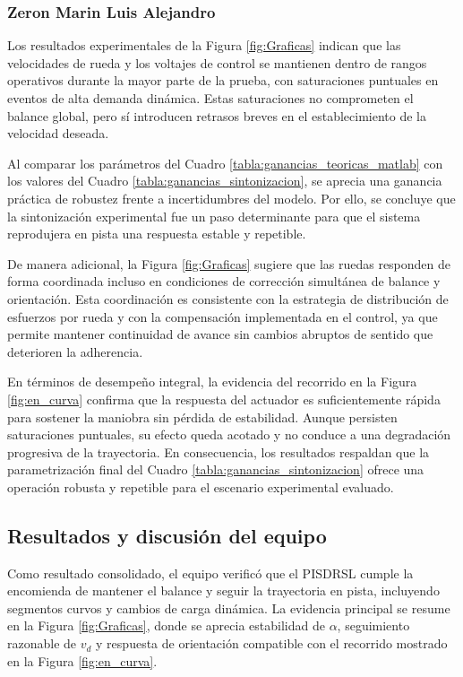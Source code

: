 \documentclass{article}
\begin{document}
\subsubsection{Zeron Marin Luis Alejandro}
Los resultados experimentales de la Figura \ref{fig:Graficas} indican que las velocidades de rueda y los voltajes de control se mantienen dentro de rangos operativos durante la mayor parte de la prueba, con saturaciones puntuales en eventos de alta demanda dinámica. Estas saturaciones no comprometen el balance global, pero sí introducen retrasos breves en el establecimiento de la velocidad deseada.

Al comparar los parámetros del Cuadro \ref{tabla:ganancias_teoricas_matlab} con los valores del Cuadro \ref{tabla:ganancias_sintonizacion}, se aprecia una ganancia práctica de robustez frente a incertidumbres del modelo. Por ello, se concluye que la sintonización experimental fue un paso determinante para que el sistema reprodujera en pista una respuesta estable y repetible.

De manera adicional, la Figura \ref{fig:Graficas} sugiere que las ruedas responden de forma coordinada incluso en condiciones de corrección simultánea de balance y orientación. Esta coordinación es consistente con la estrategia de distribución de esfuerzos por rueda y con la compensación implementada en el control, ya que permite mantener continuidad de avance sin cambios abruptos de sentido que deterioren la adherencia.

En términos de desempeño integral, la evidencia del recorrido en la Figura \ref{fig:en_curva} confirma que la respuesta del actuador es suficientemente rápida para sostener la maniobra sin pérdida de estabilidad. Aunque persisten saturaciones puntuales, su efecto queda acotado y no conduce a una degradación progresiva de la trayectoria. En consecuencia, los resultados respaldan que la parametrización final del Cuadro \ref{tabla:ganancias_sintonizacion} ofrece una operación robusta y repetible para el escenario experimental evaluado.
 
\subsection{Resultados y discusión del equipo}
Como resultado consolidado, el equipo verificó que el PISDRSL cumple la encomienda de mantener el balance y seguir la trayectoria en pista, incluyendo segmentos curvos y cambios de carga dinámica. La evidencia principal se resume en la Figura \ref{fig:Graficas}, donde se aprecia estabilidad de $\alpha$, seguimiento razonable de $v_d$ y respuesta de orientación compatible con el recorrido mostrado en la Figura \ref{fig:en_curva}.
\end{document}
